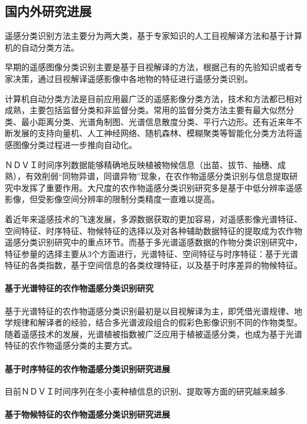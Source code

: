 \subsection{国内外研究进展}
遥感分类识别方法主要分为两大类，基于专家知识的人工目视解译方法和基于计算机的自动分类方法。

早期的遥感图像分类识别主要是基于目视解译的方法，根据己有的先验知识或者专家决策，通过目视解译遥感影像中各地物的特征进行遥感分类识别。

计算机自动分类方法是目前应用最广泛的遥感影像分类方法，技术和方法都已相对成熟，主要包括监督分类和非监督分类。常用的监督分类方法主要有最大似然分类、最小距离分类、光谱角制图、光谱信息散度分类、平行六边形。还有近来年不断发展的支持向量机、人工神经网络、随机森林、模糊聚类等智能化分类方法将遥感图像分类过程进一步推向自动化。

ＮＤＶＩ时间序列数据能够精确地反映植被物候信息（出苗、拔节、抽穗、成熟），有效削弱“同物异谱，同谱异物”现象，在农作物遥感分类识别与信息提取研究中发挥了重要作用。大尺度的农作物遥感分类识别研究多是基于中低分辨率遥感影像，但受影像空间分辨率的限制分类精度一直难以提高。

着近年来遥感技术的飞速发展，多源数据获取的更加容易，对遥感影像光谱特征、空间特征、时序特征、物候特征的选择以及对各种辅助数据特征的提取成为农作物遥感分类识别研究中的重点环节。而基于多光谱遥感数据的作物分类识别研究中，特征参量的选择主要从3个方面进行，光谱特征、空间特征与时序特征：基于光谱特征的各类指数，基于空间信息的各类纹理特征，以及基于时序差异的物候特征。

\paragraph*{基于光谱特征的农作物遥感分类识别研究}

基于光谱特征的农作物遥感分类识别最初是以目视解译为主，即凭借光谱规律、地学规律和解译者的经验，结合多光谱波段组合的假彩色影像识别不同的作物类型。随着遥感技术的发展，光谱植被指数被广泛应用于植被遥感分类，也成为基于光谱特征的农作物遥感分类的主要方式。

\paragraph*{基于时序特征的农作物遥感分类识别研究进展}
目前ＮＤＶＩ时间序列在冬小麦种植信息的识别、提取等方面的研究越来越多.

\paragraph*{基于物候特征的农作物遥感分类识别研究进展}

